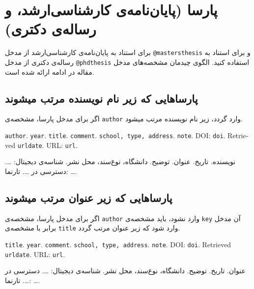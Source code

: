 \documentclass[a4paper,11pt]{article}
\begin{document}
\section{پارسا (پایان‌نامه‌ی کارشناسی‌ارشد، و رساله‌ی دکتری)}
برای استناد به پایان‌نامه‌ی کارشناسی‌ارشد از مدخل \verb|@mastersthesis| و برای استناد به رساله‌ی دکتری از مدخل \verb|@phdthesis| استفاده کنید. الگوی چیدمان مشخصه‌های مدخل مقاله در ادامه ارائه شده است.





\subsection{پارساهایی که زیر نام نویسنده مرتب میشوند}
اگر برای مدخل پارسا، مشخصه‌ی \verb|author| وارد گردد، زیر نام نویسنده مرتب میشود.

\begin{itemize}[nosep]
\begin{latin}
\item[] []
{\tt author}. {\tt year}. {\tt title}. {\tt comment}. {\tt school, type, address}. {\tt note}. DOI: {\tt doi}. Retrieved {\tt urldate}. URL: {\tt url}. 
\end{latin}

\item[] []
{\persianttfamily نویسنده}. {\persianttfamily تاریخ}. {\persianttfamily عنوان}. {\persianttfamily توضیح}. {\persianttfamily دانشگاه، نوع‌سند، محل نشر}. شناسه‌ی دیجیتال: {\persianttfamily …}. دسترسی در {\persianttfamily …}. تارنما: {\persianttfamily …}. 
\end{itemize}





\subsection{پارساهایی که زیر عنوان مرتب میشوند}
اگر برای مدخل پارسا، مشخصه‌ی \verb|author| وارد نشود، باید مشخصه‌ی \verb|key| آن مدخل برابر با مشخصه‌ی \verb|title| وارد شود که زیر عنوان مرتب گردد.

\begin{itemize}[nosep]
\begin{latin}
\item[] []
{\tt title}. {\tt year}. {\tt comment}. {\tt school, type, address}. {\tt note}. DOI: {\tt doi}. Retrieved {\tt urldate}. URL: {\tt url}. 
\end{latin}

\item[] []
{\persianttfamily عنوان}. {\persianttfamily تاریخ}. {\persianttfamily توضیح}. {\persianttfamily دانشگاه، نوع‌سند، محل نشر}. شناسه‌ی دیجیتال: {\persianttfamily …}. دسترسی در {\persianttfamily …}. تارنما: {\persianttfamily …}. 
\end{itemize}
\end{document}
